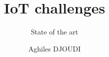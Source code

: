 


\usepackage{amsmath}
\usepackage{amssymb}
\usepackage{calc}
\title{IoT challenges}
\subtitle{State of the art}
\author{Aghiles DJOUDI}

